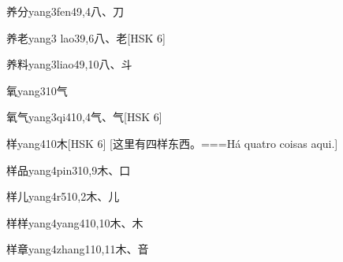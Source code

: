 \begin{EntryWithPhonetic}{养分}{yang3fen4}{9,4}{⼋、⼑}
\end{EntryWithPhonetic}

\begin{EntryWithPhonetic}{养老}{yang3 lao3}{9,6}{⼋、⽼}[HSK 6]
\end{EntryWithPhonetic}

\begin{EntryWithPhonetic}{养料}{yang3liao4}{9,10}{⼋、⽃}
\end{EntryWithPhonetic}

\begin{EntryWithPhonetic}{氧}{yang3}{10}{⽓}
\end{EntryWithPhonetic}

\begin{EntryWithPhonetic}{氧气}{yang3qi4}{10,4}{⽓、⽓}[HSK 6]
\end{EntryWithPhonetic}

\begin{EntryWithPhonetic}{样}{yang4}{10}{⽊}[HSK 6]
  [这里有四样东西。===Há quatro coisas aqui.]
\end{EntryWithPhonetic}

\begin{EntryWithPhonetic}{样品}{yang4pin3}{10,9}{⽊、⼝}
\end{EntryWithPhonetic}

\begin{EntryWithPhonetic}{样儿}{yang4r5}{10,2}{⽊、⼉}
\end{EntryWithPhonetic}

\begin{EntryWithPhonetic}{样样}{yang4yang4}{10,10}{⽊、⽊}
\end{EntryWithPhonetic}

\begin{EntryWithPhonetic}{样章}{yang4zhang1}{10,11}{⽊、⾳}
\end{EntryWithPhonetic}

